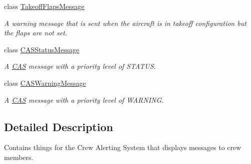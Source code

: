 \begin{DoxyCompactItemize}
class \hyperlink{class_challenger604_systems_1_1_c_a_s_1_1_takeoff_flaps_message}{Takeoff\-Flaps\-Message}
\begin{DoxyCompactList}\small\item\em A warning message that is sent when the aircraft is in takeoff configuration but the flaps are not set. \end{DoxyCompactList}\item 
class \hyperlink{class_challenger604_systems_1_1_c_a_s_1_1_c_a_s_status_message}{C\-A\-S\-Status\-Message}
\begin{DoxyCompactList}\small\item\em A \hyperlink{namespace_challenger604_systems_1_1_c_a_s}{C\-A\-S} message with a priority level of S\-T\-A\-T\-U\-S. \end{DoxyCompactList}\item 
class \hyperlink{class_challenger604_systems_1_1_c_a_s_1_1_c_a_s_warning_message}{C\-A\-S\-Warning\-Message}
\begin{DoxyCompactList}\small\item\em A \hyperlink{namespace_challenger604_systems_1_1_c_a_s}{C\-A\-S} message with a priority level of W\-A\-R\-N\-I\-N\-G. \end{DoxyCompactList}\end{DoxyCompactItemize}


\subsection{Detailed Description}
Contains things for the Crew Alerting System that displays messages to crew members. 